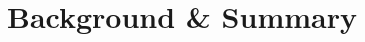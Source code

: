 \documentclass[14pt, a4paper]{article}
\begin{document}
\section{Background \& Summary}
%
%
%
%
%
%
%
\end{document}
